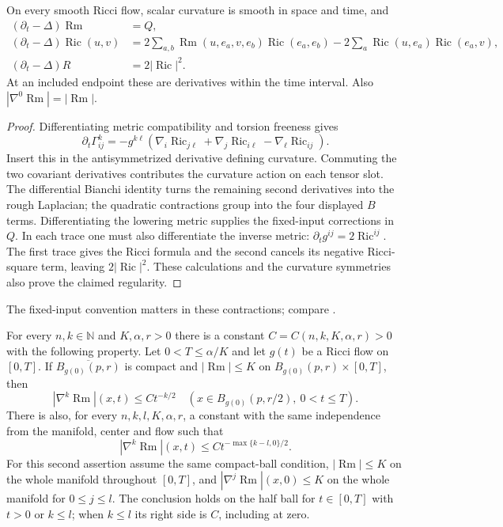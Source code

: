 \begin{proposition}\label{prop:rf-evolution}
On every smooth Ricci flow, scalar curvature is smooth in space and time,
and
\[
\begin{split}
 (\partial_t-\Delta)\operatorname{Rm}&=Q,\\
 (\partial_t-\Delta)\operatorname{Ric}(u,v)
 &=2\sum_{a,b}\operatorname{Rm}(u,e_a,v,e_b)\operatorname{Ric}(e_a,e_b)
       -2\sum_a\operatorname{Ric}(u,e_a)\operatorname{Ric}(e_a,v),\\
 (\partial_t-\Delta)R&=2|\operatorname{Ric}|^2.
\end{split}
\]
At an included endpoint these are derivatives within the time interval.
Also $|\nabla^0\operatorname{Rm}|=|\operatorname{Rm}|$.
\end{proposition}
\begin{proof}
Differentiating metric compatibility and torsion freeness gives
\[
 \partial_t\Gamma^k_{ij}
 =-g^{k\ell}(\nabla_i\operatorname{Ric}_{j\ell}
             +\nabla_j\operatorname{Ric}_{i\ell}
             -\nabla_\ell\operatorname{Ric}_{ij}).
\]
Insert this in the antisymmetrized derivative defining curvature.
Commuting the two covariant derivatives contributes the curvature
action on each tensor slot.  The differential Bianchi identity turns
the remaining second derivatives into the rough Laplacian; the
quadratic contractions group into the four displayed $B$ terms.
Differentiating the lowering metric supplies the fixed-input corrections
in $Q$.  In each trace one must also differentiate the inverse metric:
$\partial_tg^{ij}=2\operatorname{Ric}^{ij}$.  The first trace gives the
Ricci formula and the second cancels its negative Ricci-square term,
leaving $2|\operatorname{Ric}|^2$.  These calculations and the curvature
symmetries also prove the claimed regularity.
\end{proof}
The fixed-input convention matters in these contractions; compare
\cite[equations (3.5)--(3.6), p.~41; Lemma 3.15, p.~42]{MT2007}.

\begin{theorem}\label{thm:rf-shi}
For every $n,k\in\mathbb N$ and $K,\alpha,r>0$ there is a constant
$C=C(n,k,K,\alpha,r)>0$ with the following property.  Let $0<T\leq\alpha/K$
and let $g(t)$ be a Ricci flow on $[0,T]$.  If
$\overline{B_{g(0)}(p,r)}$ is compact and $|\operatorname{Rm}|\leq K$ on
$B_{g(0)}(p,r)\times[0,T]$, then
\[
 |\nabla^k\operatorname{Rm}|(x,t)\leq C t^{-k/2}
 \quad (x\in B_{g(0)}(p,r/2),\ 0<t\leq T).
\]
There is also, for every $n,k,l,K,\alpha,r$, a constant with the same
independence from the manifold, center and flow such that
\[
 |\nabla^k\operatorname{Rm}|(x,t)
       \leq C t^{-\max\{k-l,0\}/2}.
\]
For this second assertion assume the same compact-ball condition,
$|\operatorname{Rm}|\leq K$ on the whole manifold throughout $[0,T]$,
and $|\nabla^j\operatorname{Rm}|(x,0)\leq K$ on the whole manifold for
$0\leq j\leq l$.  The conclusion holds on the half ball for
$t\in[0,T]$ with $t>0$ or $k\leq l$; when $k\leq l$ its right side is $C$,
including at zero.
\end{theorem}

